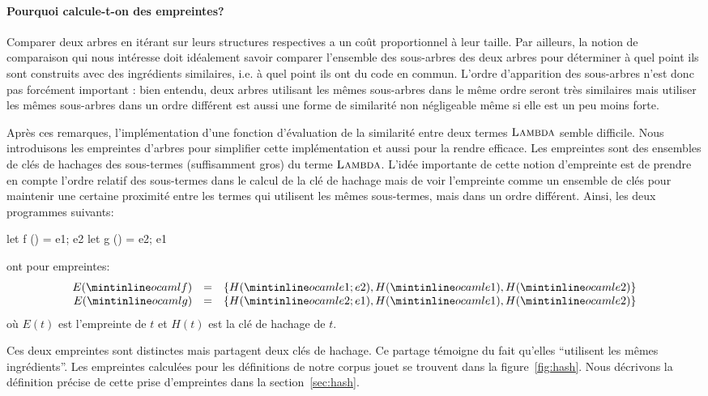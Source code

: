 \paragraph{Pourquoi calcule-t-on des empreintes?}

Comparer deux arbres en itérant sur leurs structures respectives a un
coût proportionnel à leur taille. Par ailleurs, la notion de
comparaison qui nous intéresse doit idéalement savoir comparer
l'ensemble des sous-arbres des deux arbres pour déterminer à quel
point ils sont construits avec des ingrédients similaires, i.e.  à
quel point ils ont du code en commun. L'ordre d'apparition des
sous-arbres n'est donc pas forcément important : bien entendu, deux
arbres utilisant les mêmes sous-arbres dans le même ordre seront
très similaires mais utiliser les mêmes sous-arbres dans un ordre
différent est aussi une forme de similarité non négligeable même
si elle est un peu moins forte.

Après ces remarques, l'implémentation d'une fonction d'évaluation de
la similarité entre deux termes $\textsc{Lambda}$ semble difficile. Nous
introduisons les empreintes d'arbres pour simplifier cette
implémentation et aussi pour la rendre efficace. Les empreintes sont
des ensembles de clés de hachages des sous-termes (suffisamment gros)
du terme $\textsc{Lambda}$. L'idée importante de cette notion d'empreinte
est de prendre en compte l'ordre relatif des sous-termes dans le
calcul de la clé de hachage mais de voir l'empreinte comme un ensemble
de clés pour maintenir une certaine proximité entre les termes qui
utilisent les mêmes sous-termes, mais dans un ordre différent. Ainsi,
les deux programmes suivants:
\begin{ocaml}
let f () = e1; e2
let g () = e2; e1
\end{ocaml}
\noindent ont pour empreintes:
\[
\begin{array}{rcl}
E(\iocaml{f}) &=& \{ H(\iocaml{e1; e2}), H(\iocaml{e1}), H(\iocaml{e2}) \} \\
E(\iocaml{g}) &=& \{ H(\iocaml{e2; e1}), H(\iocaml{e1}), H(\iocaml{e2}) \}
\end{array}
\]
\noindent où $E(t)$ est l'empreinte de $t$ et $H(t)$ est la clé de hachage de $t$.

Ces deux empreintes sont distinctes mais partagent deux clés de
hachage. Ce partage témoigne du fait qu'elles ``utilisent les mêmes
ingrédients''. Les empreintes calculées pour les définitions de notre
corpus jouet se trouvent dans la figure~\ref{fig:hash}. Nous décrivons
la définition précise de cette prise d'empreintes dans la
section~\ref{sec:hash}.

